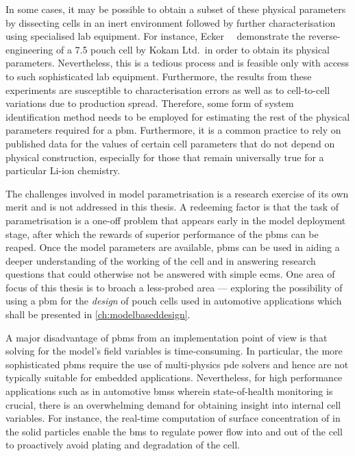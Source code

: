 In  some  cases, it  may  be  possible to  obtain  a  subset of  these  physical
parameters   by  dissecting   cells  in   an  inert   environment  followed   by
further  characterisation   using  specialised  lab  equipment.   For  instance,
Ecker~\etal~\cite{Ecker2015}   demonstrate   the    reverse-engineering   of   a
\SI{7.5}{\amphour} pouch  cell by Kokam  Ltd.\ in  order to obtain  its physical
parameters. Nevertheless,  this is a tedious  process and is feasible  only with
access  to  such sophisticated  lab  equipment.  Furthermore, the  results  from
these  experiments are  susceptible to  characterisation  errors as  well as  to
cell-to-cell variations due to production spread. Therefore, some form of system
identification  method needs  to  be employed  for estimating  the  rest of  the
physical  parameters required  for  a  \gls{pbm}. Furthermore,  it  is a  common
practice to  rely on published  data for the  values of certain  cell parameters
that do  not depend on physical  construction, especially for those  that remain
universally true for a particular Li-ion chemistry.

The challenges involved  in model parametrisation is a research  exercise of its
own merit and  is not addressed in  this thesis. A redeeming factor  is that the
task of  parametrisation is a  one-off problem that  appears early in  the model
deployment  stage,  after which  the  rewards  of  superior performance  of  the
\glspl{pbm} can be reaped. Once  the model parameters are available, \glspl{pbm}
can be used in  aiding a deeper understanding of the working of  the cell and in
answering research  questions that could  otherwise not be answered  with simple
\glspl{ecm}. One area  of focus of this  thesis is to broach  a less-probed area
--- exploring  the possibility  of using  a \gls{pbm}  for the  \emph{design} of
pouch  cells  used  in  automotive  applications which  shall  be  presented  in
\cref{ch:modelbaseddesign}.

A major disadvantage of \glspl{pbm} from an implementation point of view is that
solving for  the model's field  variables is time-consuming. In  particular, the
more  sophisticated  \glspl{pbm}  require  the use  of  multi-physics  \gls{pde}
solvers  and  hence  are  not  typically  suitable  for  embedded  applications.
Nevertheless,  for   high  performance   applications  such  as   in  automotive
\glspl{bms}  wherein   state-of-health  monitoring  is  crucial,   there  is  an
overwhelming  demand for  obtaining insight  into internal  cell variables.  For
instance, the real-time computation of surface concentration of  in the
solid particles enable the \gls{bms} to regulate  power flow into and out of the
cell to proactively avoid plating and degradation of the cell.

